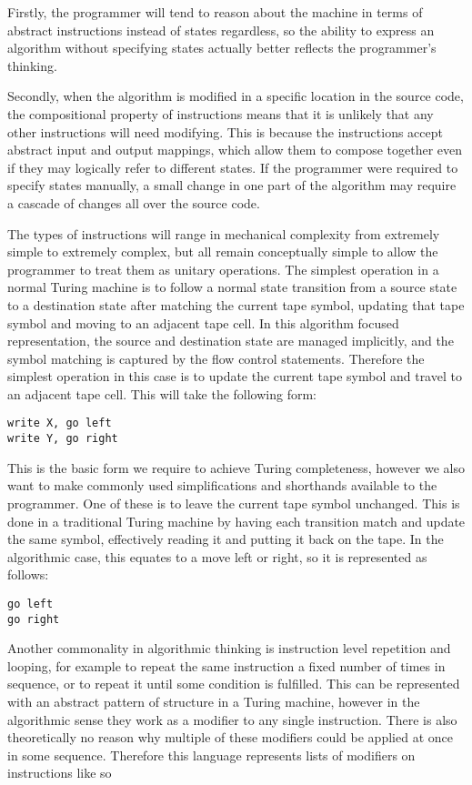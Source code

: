 \documentclass[11pt]{article}
\begin{document}
Firstly, the programmer will tend to reason about the machine in terms of abstract instructions instead of states regardless, so the ability to express an algorithm without specifying states actually better reflects the programmer's thinking.

Secondly, when the algorithm is modified in a specific location in the source code, the compositional property of instructions means that it is unlikely that any other instructions will need modifying. This is because the instructions accept abstract input and output mappings, which allow them to compose together even if they may logically refer to different states. If the programmer were required to specify states manually, a small change in one part of the algorithm may require a cascade of changes all over the source code.

The types of instructions will range in mechanical complexity from extremely simple to extremely complex, but all remain conceptually simple to allow the programmer to treat them as unitary operations. The simplest operation in a normal Turing machine is to follow a normal state transition from a source state to a destination state after matching the current tape symbol, updating that tape symbol and moving to an adjacent tape cell. In this algorithm focused representation, the source and destination state are managed implicitly, and the symbol matching is captured by the flow control statements. Therefore the simplest operation in this case is to update the current tape symbol and travel to an adjacent tape cell. This will take the following form:

\begin{verbatim}
write X, go left
write Y, go right
\end{verbatim}

This is the basic form we require to achieve Turing completeness, however we also want to make commonly used simplifications and shorthands available to the programmer. One of these is to leave the current tape symbol unchanged. This is done in a traditional Turing machine by having each transition match and update the same symbol, effectively reading it and putting it back on the tape. In the algorithmic case, this equates to a move left or right, so it is represented as follows:

\begin{verbatim}
go left
go right
\end{verbatim}

Another commonality in algorithmic thinking is instruction level repetition and looping, for example to repeat the same instruction a fixed number of times in sequence, or to repeat it until some condition is fulfilled. This can be represented with an abstract pattern of structure in a Turing machine, however in the algorithmic sense they work as a modifier to any single instruction. There is also theoretically no reason why multiple of these modifiers could be applied at once in some sequence. Therefore this language represents lists of modifiers on instructions like so
\end{document}
